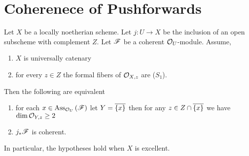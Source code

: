 \documentclass[12pt]{article}
\begin{document}
\section{Coherenece of Pushforwards}

\begin{theorem}
Let $X$ be a locally noetherian scheme. Let $j : U \to X$ be the inclusion of an open subscheme with complement $Z$. Let $\mathscr{F}$ be a coherent $\mathcal{O}_{U}$-module. Assume,
\begin{enumerate}
\item $X$ is universally catenary
\item for every $z \in Z$ the formal fibers of $\mathcal{O}_{X, z}$ are ($S_1$).
\end{enumerate}
Then the following are equivalent
\begin{enumerate}
\item for each $x \in \mathrm{Ass}_{\mathcal{O}_{U}}\left( \mathscr{F} \right)$ let $Y = \overline{ \{ x \} }$ then for any $z \in Z \cap \overline{ \{ x \} }$ we have $\dim{\mathcal{O}_{Y, z}} \ge 2$
\item $j_* \mathscr{F}$ is coherent.
\end{enumerate}
\end{theorem}

\begin{rmk}
In particular, the hypotheses hold when $X$ is excellent. 
\end{rmk}
\end{document}
